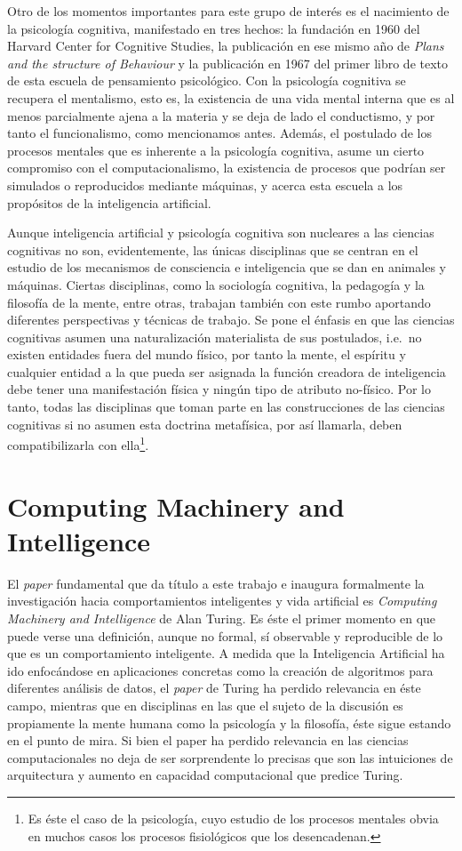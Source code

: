 \documentclass[12pt]{memoir}
\begin{document}
Otro de los momentos importantes para este grupo de interés es el nacimiento de la psicología cognitiva, manifestado en tres hechos: la fundación en 1960 del Harvard Center for Cognitive Studies, la publicación en ese mismo año de \textit{Plans and the structure of Behaviour} y la publicación en 1967 del primer libro de texto de esta escuela de pensamiento psicológico. Con la psicología cognitiva se recupera el mentalismo, esto es, la existencia de una vida mental interna que es al menos parcialmente ajena a la materia y se deja de lado el conductismo, y por tanto el funcionalismo, como mencionamos antes. Además, el postulado de los procesos mentales que es inherente a la psicología cognitiva, asume un cierto compromiso con el computacionalismo, la existencia de procesos que podrían ser simulados o reproducidos mediante máquinas, y acerca esta escuela a los propósitos de la inteligencia artificial.

Aunque inteligencia artificial y psicología cognitiva son nucleares a las ciencias cognitivas no son, evidentemente, las únicas disciplinas que se centran en el estudio de los mecanismos de consciencia e inteligencia que se dan en animales y máquinas. Ciertas disciplinas, como la sociología cognitiva, la pedagogía y la filosofía de la mente, entre otras, trabajan también con este rumbo aportando diferentes perspectivas y técnicas de trabajo. Se pone el énfasis en que las ciencias cognitivas asumen una naturalización materialista de sus postulados, i.e.\ no existen entidades fuera del mundo físico, por tanto la mente, el espíritu y cualquier entidad a la que pueda ser asignada la función creadora de inteligencia debe tener una manifestación física y ningún tipo de atributo no-físico. Por lo tanto, todas las disciplinas que toman parte en las construcciones de las ciencias cognitivas si no asumen esta doctrina metafísica, por así llamarla, deben compatibilizarla con ella\footnote{Es éste el caso de la psicología, cuyo estudio de los procesos mentales obvia en muchos casos los procesos fisiológicos que los desencadenan.}.

\section{Computing Machinery and Intelligence}

El \textit{paper} fundamental que da título a este trabajo e inaugura formalmente la investigación hacia comportamientos inteligentes y vida artificial es \textit{Computing Machinery and Intelligence} de Alan Turing. Es éste el primer momento en que puede verse una definición, aunque no formal, sí observable y reproducible de lo que es un comportamiento inteligente. A medida que la Inteligencia Artificial ha ido enfocándose en aplicaciones concretas como la creación de algoritmos para diferentes análisis de datos, el \textit{paper} de Turing ha perdido relevancia en éste campo, mientras que en disciplinas en las que el sujeto de la discusión es propiamente la mente humana como la psicología y la filosofía, éste sigue estando en el punto de mira. Si bien el paper ha perdido relevancia en las ciencias computacionales no deja de ser sorprendente lo precisas que son las intuiciones de arquitectura y aumento en capacidad computacional que predice Turing.
\end{document}
